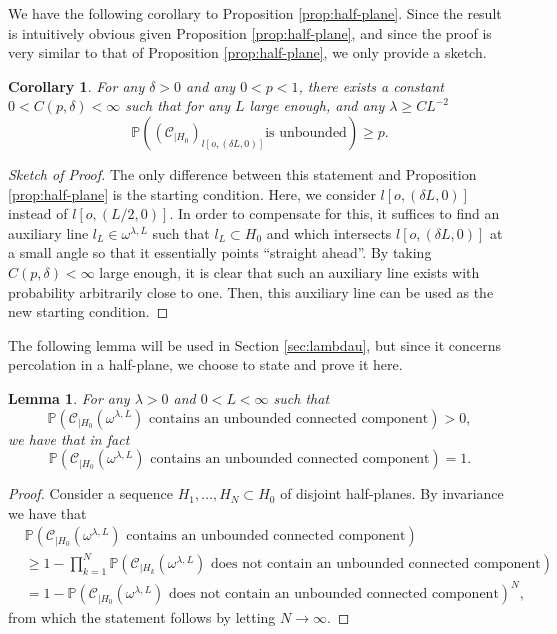\documentclass[a4paper,12pt]{article}
\newcommand{\BP}{{\mathbb{P}}}
\newcommand{\CC}{{\mathcal{C}}}
\newtheorem{lemma}[theorem]{Lemma}
\newtheorem{corollary}[theorem]{Corollary}
\begin{document}
We have the following corollary to Proposition \ref{prop:half-plane}. 
Since the result is intuitively obvious given Proposition \ref{prop:half-plane}, and since 
the proof is 
very similar to that of Proposition \ref{prop:half-plane}, we only provide a sketch.
\begin{corollary} \label{cor:seedperc}
For any $\delta>0$ and any $0<p<1$, there exists a constant $0<C(p,\delta)<\infty$ such that 
for any $L$ large enough, and any $\lambda \geq C L^{-2}$
\[
\BP(\left(\CC_{|H_0}\right)_{l[o,(\delta L,0)]} \textrm{is unbounded}) \geq p.
\]
\end{corollary}
\begin{proof}[Sketch of Proof]
The only difference between this statement and Proposition \ref{prop:half-plane} is the 
starting condition. Here, we consider $l[o,(\delta L,0)]$ instead of $l[o,(L/2,0)].$ In order 
to compensate for this, it suffices to find an auxiliary line $l_L\in \omega^{\lambda,L}$ 
such that $l_L \subset H_0$ and which intersects $l[o,(\delta L,0)]$ at a small angle
so that it essentially points ``straight ahead''. By taking $C(p,\delta)<\infty$ large enough,
it is clear that such an auxiliary line exists with probability arbitrarily close to one.
Then, this auxiliary line can be used 
as the new starting condition.
\end{proof}


The following lemma will be used in Section \ref{sec:lambdau}, but since it concerns 
percolation in a half-plane, we choose to state and prove it here.
\begin{lemma} \label{lemma:half-planeperc}
For any $\lambda>0$ and $0<L<\infty$ such that  
\[
\BP(\CC_{|H_0}(\omega^{\lambda,L}) \textrm{ contains an unbounded connected component})>0,
\]   
we have that in fact 
\[
\BP(\CC_{|H_0}(\omega^{\lambda,L}) \textrm{ contains an unbounded connected component})=1.
\]
\end{lemma} 
\begin{proof}
Consider a sequence $H_1,\ldots, H_N \subset H_0$ of disjoint half-planes. By invariance
we have that 
\begin{align*}
& \BP(\CC_{|H_0}(\omega^{\lambda,L}) \textrm{ contains an unbounded connected component}) \\
& \geq 1-
\prod_{k=1}^N \BP(\CC_{|H_k}(\omega^{\lambda,L}) \textrm{ does not contain an unbounded connected component})  \\
&=1-\BP(\CC_{|H_0}(\omega^{\lambda,L}) \textrm{ does not contain an unbounded connected component})^N,
\end{align*}
from which the statement follows by letting $N \to \infty.$
\end{proof}
\end{document}
